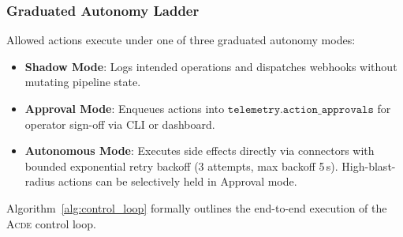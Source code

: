 \subsubsection{Graduated Autonomy Ladder}
Allowed actions execute under one of three graduated autonomy modes:
\begin{itemize}
    \item \textbf{Shadow Mode}: Logs intended operations and dispatches webhooks without mutating pipeline state.
    \item \textbf{Approval Mode}: Enqueues actions into $\texttt{telemetry.action\_approvals}$ for operator sign-off via CLI or dashboard.
    \item \textbf{Autonomous Mode}: Executes side effects directly via connectors with bounded exponential retry backoff (3 attempts, max backoff 5\,s). High-blast-radius actions can be selectively held in Approval mode.
\end{itemize}

Algorithm~\ref{alg:control_loop} formally outlines the end-to-end execution of the \textsc{Acde} control loop.

